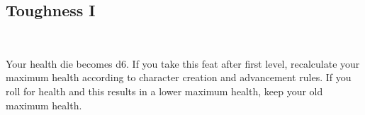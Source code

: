 \subsection*{Toughness I}\label{feat:toughness1}
 \\

Your health die becomes d6. If you take this feat after first level,
recalculate your maximum health according to character creation and advancement
rules. If you roll for health and this results in a lower maximum health, keep
your old maximum health.
